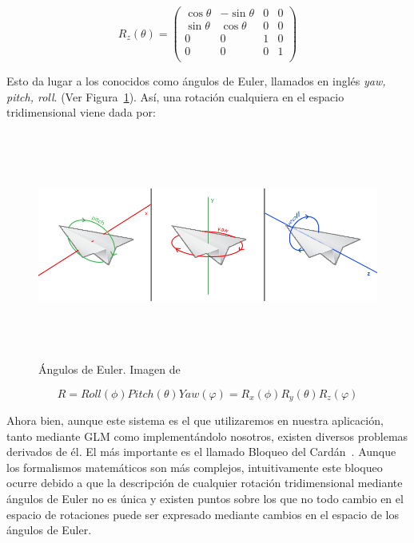 \begin{equation}
	R_z(\theta) =
	\left(	
		\begin{array}{cccc}
			\cos{\theta} & -\sin{\theta} & 0 & 0 \\				
			\sin{\theta} & \cos{\theta} & 0 & 0 \\				
			0 & 0 & 1 & 0\\				
			0 & 0 & 0 & 1 \\				
		\end{array}
	\right)
\end{equation} 

Esto da lugar a los conocidos como ángulos de Euler, llamados en inglés
\textit{yaw, pitch, roll}. (Ver Figura~\ref{fig:eulerangles}). Así, una rotación
cualquiera en el espacio tridimensional viene dada por:

\begin{figure}
	\centering
	\includegraphics[height=7.5cm,width=\textwidth]{figures/eulerangles.png}
	\caption{Ángulos de Euler. Imagen de~\citet{LearnOpenGL}}
	\label{fig:eulerangles}
\end{figure}

\begin{equation}
		R = Roll(\phi)Pitch(\theta)Yaw(\varphi) = R_x(\phi)R_y(\theta)R_z(\varphi)	
\end{equation}

Ahora bien, aunque este sistema es el que utilizaremos en nuestra aplicación,
tanto mediante GLM como implementándolo nosotros, existen diversos problemas
derivados de él. El más importante es el llamado Bloqueo del
Cardán~\cite{Vince:2011:QCG:2016678}. Aunque los formalismos matemáticos son más
complejos, intuitivamente este bloqueo ocurre debido a que la descripción de
cualquier rotación tridimensional mediante ángulos de Euler no es única y
existen puntos sobre los que no todo cambio en el espacio de rotaciones puede
ser expresado mediante cambios en el espacio de los ángulos de Euler. 

